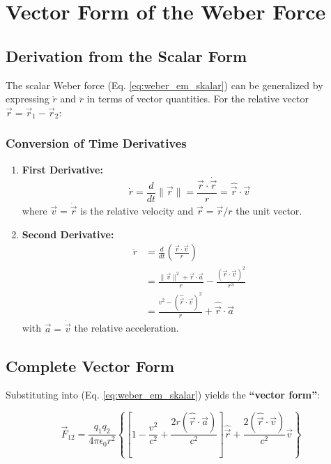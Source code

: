 \section{Vector Form of the Weber Force}
\subsection{Derivation from the Scalar Form}

The scalar Weber force (Eq. \ref{eq:weber_em_skalar}) can be generalized by expressing $\dot{r}$ and $\ddot{r}$ in terms of vector quantities.
For the relative vector $\vec{r} = \vec{r}_1 - \vec{r}_2$:

\subsubsection{Conversion of Time Derivatives}
\begin{enumerate}
\item \textbf{First Derivative:}
\begin{equation}
\dot{r} = \frac{d}{dt}\|\vec{r}\| = \frac{\vec{r} \cdot \dot{\vec{r}}}{r} = \hat{\vec{r}} \cdot \vec{v}
\end{equation}
where $\vec{v} = \dot{\vec{r}}$ is the relative velocity and $\hat{\vec{r}} = \vec{r}/r$ the unit vector.

\item \textbf{Second Derivative:}
\begin{align}
\ddot{r} &= \frac{d}{dt}\left(\frac{\vec{r} \cdot \vec{v}}{r}\right) \nonumber \\
&= \frac{\|\vec{v}\|^2 + \vec{r} \cdot \vec{a}}{r} - \frac{(\vec{r} \cdot \vec{v})^2}{r^3} \nonumber \\
&= \frac{v^2 - (\hat{\vec{r}} \cdot \vec{v})^2}{r} + \hat{\vec{r}} \cdot \vec{a}
\end{align}
with $\vec{a} = \dot{\vec{v}}$ the relative acceleration.
\end{enumerate}

\subsection{Complete Vector Form}
Substituting into (Eq. \ref{eq:weber_em_skalar}) yields the \textbf{\enquote{vector form}}:

\begin{equation}
\vec{F}_{12} = \frac{q_1 q_2}{4\pi\epsilon_0 r^2} \left\{
\left[1 - \frac{v^2}{c^2} + \frac{2r(\hat{\vec{r}} \cdot \vec{a})}{c^2}\right]\hat{\vec{r}} + \frac{2(\hat{\vec{r}} \cdot \vec{v})}{c^2}\vec{v}
\right\}
\label{eq:weber_vector}
\end{equation}

